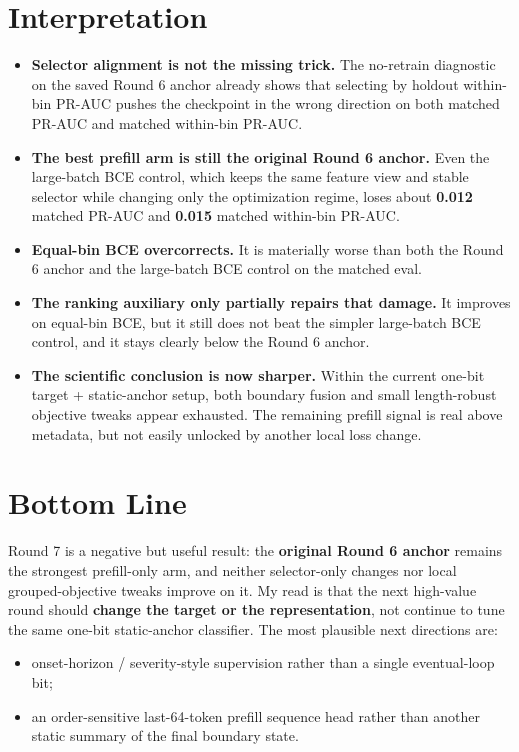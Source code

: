 \documentclass[11pt]{article}
\begin{document}
\section*{Interpretation}
\begin{itemize}
  \item \textbf{Selector alignment is not the missing trick.} The no-retrain diagnostic on the saved Round 6 anchor already shows that selecting by holdout within-bin PR-AUC pushes the checkpoint in the wrong direction on both matched PR-AUC and matched within-bin PR-AUC.
  \item \textbf{The best prefill arm is still the original Round 6 anchor.} Even the large-batch BCE control, which keeps the same feature view and stable selector while changing only the optimization regime, loses about \textbf{0.012} matched PR-AUC and \textbf{0.015} matched within-bin PR-AUC.
  \item \textbf{Equal-bin BCE overcorrects.} It is materially worse than both the Round 6 anchor and the large-batch BCE control on the matched eval.
  \item \textbf{The ranking auxiliary only partially repairs that damage.} It improves on equal-bin BCE, but it still does not beat the simpler large-batch BCE control, and it stays clearly below the Round 6 anchor.
  \item \textbf{The scientific conclusion is now sharper.} Within the current one-bit target + static-anchor setup, both boundary fusion and small length-robust objective tweaks appear exhausted. The remaining prefill signal is real above metadata, but not easily unlocked by another local loss change.
\end{itemize}

\section*{Bottom Line}
Round 7 is a negative but useful result: the \textbf{original Round 6 anchor} remains the strongest prefill-only arm, and neither selector-only changes nor local grouped-objective tweaks improve on it. My read is that the next high-value round should \textbf{change the target or the representation}, not continue to tune the same one-bit static-anchor classifier. The most plausible next directions are:
\begin{itemize}
  \item onset-horizon / severity-style supervision rather than a single eventual-loop bit;
  \item an order-sensitive last-64-token prefill sequence head rather than another static summary of the final boundary state.
\end{itemize}
\end{document}
